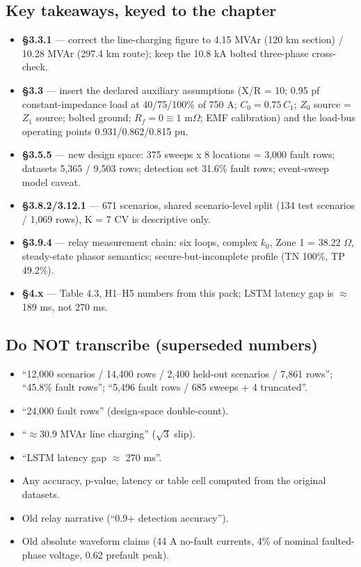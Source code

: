 \documentclass[11pt,a4paper]{article}
\begin{document}
\subsection{Key takeaways, keyed to the chapter}
\begin{itemize}
\item \textbf{\S3.3.1} --- correct the line-charging figure to
4.15 MVAr (120 km section) / 10.28 MVAr (297.4 km route); keep the
10.8 kA bolted three-phase cross-check.
\item \textbf{\S3.3} --- insert the declared auxiliary assumptions
(X/R = 10; 0.95 pf constant-impedance load at 40/75/100\% of 750 A;
$C_0 = 0.75\,C_1$; $Z_0$ source = $Z_1$ source; bolted ground;
$R_f = 0 \equiv 1$ m$\Omega$; EMF calibration) and the load-bus
operating points 0.931/0.862/0.815 pu.
\item \textbf{\S3.5.5} --- new design space: 375 sweeps x 8
locations = 3{,}000 fault rows; datasets 5{,}365 / 9{,}503 rows;
detection set 31.6\% fault rows; event-sweep model caveat.
\item \textbf{\S3.8.2/3.12.1} --- 671 scenarios, shared
scenario-level split (134 test scenarios / 1{,}069 rows), K = 7 CV is
descriptive only.
\item \textbf{\S3.9.4} --- relay measurement chain: six loops,
complex $k_0$, Zone 1 = 38.22 $\Omega$, steady-state phasor
semantics; secure-but-incomplete profile (TN 100\%, TP 49.2\%).
\item \textbf{\S4.x} --- Table 4.3, H1--H5 numbers from this pack;
LSTM latency gap is $\approx$189 ms, not 270 ms.
\end{itemize}

\subsection{Do NOT transcribe (superseded numbers)}
\begin{itemize}
\item ``12{,}000 scenarios / 14{,}400 rows / 2{,}400 held-out
scenarios / 7{,}861 rows''; ``45.8\% fault rows''; ``5{,}496 fault
rows / 685 sweeps + 4 truncated''.
\item ``24{,}000 fault rows'' (design-space double-count).
\item ``$\approx$30.9 MVAr line charging'' ($\sqrt{3}$ slip).
\item ``LSTM latency gap $\approx$ 270 ms''.
\item Any accuracy, p-value, latency or table cell computed from the
original datasets.
\item Old relay narrative (``0.9+ detection accuracy'').
\item Old absolute waveform claims (44 A no-fault currents, 4\% of
nominal faulted-phase voltage, 0.62 prefault peak).
\end{itemize}
\end{document}
